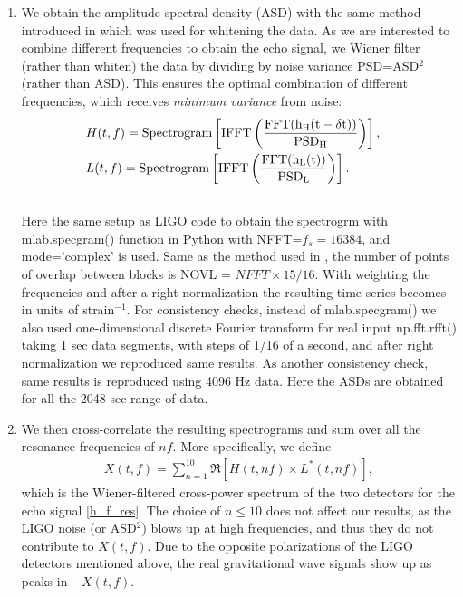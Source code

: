 \documentclass[a4paper,11pt]{article}
\newcommand{\nn}{\nonumber}
\begin{document}
\begin{enumerate}
\item We obtain the amplitude spectral density (ASD) with the same method introduced in \cite{GW150914} which was used for whitening the data. As we are interested to combine different frequencies to obtain the echo signal, we Wiener filter (rather than whiten) the data by dividing by noise variance PSD=ASD$^2$ (rather than ASD). This ensures the optimal combination of different frequencies, which receives {\it minimum variance} from noise:%
\begin{eqnarray}
&H(t,f)=\rm{Spectrogram}\left[ \rm{IFFT}\left( \frac{\rm{FFT}(h_{H}(t-\delta t))}{PSD_{H}} \right) \right],& \nn\\ 
&L(t,f)=\rm{Spectrogram}\left[ \rm{IFFT}\left( \frac{\rm{FFT}(h_{L}(t))}{PSD_{L}} \right) \right].& \nn\\ &&
\end{eqnarray}
Here the same setup as LIGO code \cite{GW150914} to obtain the spectrogrm with mlab.specgram() function in Python with NFFT=$f_{s}=16384$, and mode='complex' is used.  Same as the method used in \cite{GW150914}, the number of points of overlap between blocks is NOVL = $NFFT \times 15/16$. %
 With weighting the frequencies and after a right normalization the resulting time series becomes in units of strain$^{-1}$. For consistency checks, instead of mlab.specgram() we also used one-dimensional discrete Fourier transform for real input np.fft.rfft() taking 1 sec data segments, with steps of 1/16 of a second, and after right normalization we reproduced same results. As another consistency check, same results is reproduced using 4096 Hz data. Here the ASDs are obtained for all the 2048 sec range of data.

\item We then cross-correlate the resulting spectrograms  and sum over all the resonance frequencies of $nf$. More specifically, we define %
\begin{eqnarray}
X(t,f)=\sum_{n=1}^{10} \Re\left[H(t,nf) \times L^*(t,nf)\right], \label{x_def}
\end{eqnarray}
which is the Wiener-filtered cross-power spectrum of the two detectors for the echo signal \ref{h_f_res}. The choice of $n\leq 10$ does not affect our results, as the LIGO noise (or ASD$^2$) blows up at high frequencies, and thus they do not contribute to $X(t,f)$. Due to the opposite polarizations of the LIGO detectors mentioned above, the real gravitational wave signals show up as peaks in $-X(t,f)$.


\end{enumerate}
\end{document}
